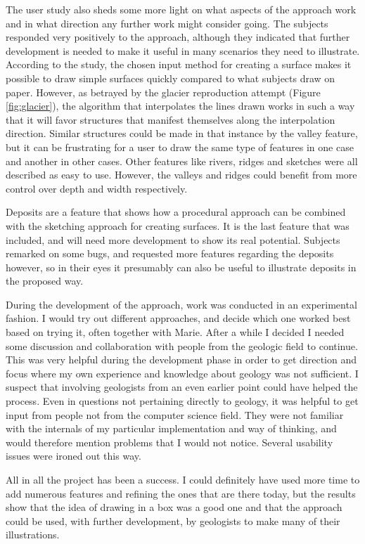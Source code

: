 \documentclass[a4paper,12pt]{report}
\begin{document}
The user study also sheds some more light on what aspects of the approach work and in what direction any further work might consider going. The subjects responded very positively to the approach, although they indicated that further development is needed to make it useful in many scenarios they need to illustrate. According to the study, the chosen input method for creating a surface makes it possible to draw simple surfaces quickly compared to what subjects draw on paper. However, as betrayed by the glacier reproduction attempt (Figure \ref{fig:glacier}), the algorithm that interpolates the lines drawn works in such a way that it will favor structures that manifest themselves along the interpolation direction. Similar structures could be made in that instance by the valley feature, but it can be frustrating for a user to draw the same type of features in one case and another in other cases. Other features like rivers, ridges and sketches were all described as easy to use. However, the valleys and ridges 
could benefit from 
more control over depth and width respectively. 

Deposits are a feature that shows how a procedural approach can be combined with the sketching approach for creating surfaces. It is the last feature that was included, and will need more development to show its real potential. Subjects remarked on some bugs, and requested more features regarding the deposits however, so in their eyes it presumably can also be useful to illustrate deposits in the proposed way. 

During the development of the approach, work was conducted in an experimental fashion. I would try out different approaches, and decide which one worked best based on trying it, often together with Marie. After a while I decided I needed some discussion and collaboration with people from the geologic field to continue. This was very helpful during the development phase in order to get direction and focus where my own experience and knowledge about geology was not sufficient. I suspect that involving geologists from an even earlier point could have helped the process. Even in questions not pertaining directly to geology, it was helpful to get input from people not from the computer science field. They were not familiar with the internals of my particular implementation and way of thinking, and would therefore mention problems that I would not notice. Several usability issues were ironed out this way.

All in all the project has been a success. I could definitely have used more time to add numerous features and refining the ones that are there today, but the results show that the idea of drawing in a box was a good one and that the approach could be used, with further development, by geologists to make many of their illustrations.
\end{document}
